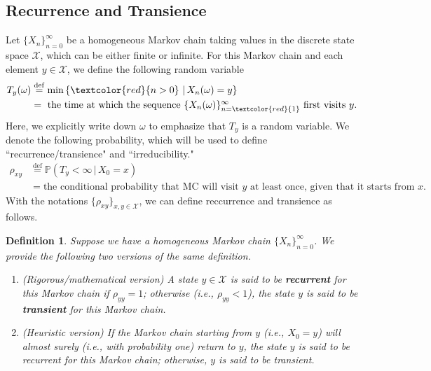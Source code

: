 \documentclass[11pt,letterpaper, leqno]{article}
\newtheorem{definition}{Definition}
\numberwithin{equation}{section}
\numberwithin{theorem}{section}
\numberwithin{lemma}{section}
\numberwithin{corollary}{section}
\numberwithin{definition}{section}
\numberwithin{proposition}{section}
\numberwithin{remark}{section}
\numberwithin{example}{section}
\begin{document}
\subsection{Recurrence and Transience}

Let $\{X_n\}_{n=0}^\infty$ be a homogeneous Markov chain taking values in the discrete state space $\mathcal{X}$, which can be either finite or infinite. For this Markov chain and each element $y\in\mathcal{X}$, we define the following random variable
\begin{align*}
    T_y(\omega) &\overset{\operatorname{def}}{=}\min\left\{\textcolor{red}{n>0}\, \,\vert\, X_n(\omega)=y\right\} \\
    &= \mbox{ the time at which the sequence $\{X_n(\omega)\}_{n=\textcolor{red}{1}}^\infty$ first visits }y.
\end{align*}
Here, we explicitly write down $\omega$ to emphasize that $T_y$ is a random variable. We denote the following probability, which will be used to define ``recurrence/transience" and ``irreducibility."
\begin{align*}
    \rho_{xy}&\overset{\operatorname{def}}{=}\mathbb{P}(T_y<\infty \,\vert \, X_0=x) \\
    & = \mbox{the conditional probability that MC will visit $y$ at least once, given that it starts from $x$.}
\end{align*}
With the notations $\{\rho_{xy}\}_{x,y\in\mathcal{X}}$, we can define reccurrence and transience as follows.
\begin{definition}
Suppose we have a homogeneous Markov chain $\{X_n\}_{n=0}^\infty$. We provide the following two versions of the same definition.
\begin{enumerate}
    \item (Rigorous/mathematical version) A state $y\in\mathcal{X}$ is said to be \textbf{recurrent} for this Markov chain if $\rho_{yy}=1$; otherwise (i.e., $\rho_{yy}<1$), the state $y$ is said to be \textbf{transient} for this Markov chain.
    \item (Heuristic version) If the Markov chain starting from $y$ (i.e., $X_0=y$) will almost surely (i.e., with probability one) return to $y$, the state $y$ is said to be recurrent for this Markov chain; otherwise, $y$ is said to be transient.
\end{enumerate}
\end{definition}
\end{document}
